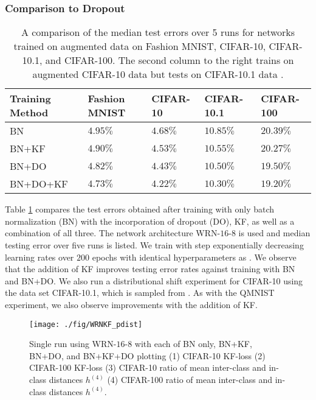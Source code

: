 \documentclass[11pt]{article}
\begin{document}
\subsubsection{Comparison to Dropout}

\begin{table}[h]
\begin{center}
\begin{tabular}{ | p{3.4cm} || p{2.0cm} | p{2.0cm} | p{2.0cm}| p{2.0cm}|}
\hline
\textbf{Training Method} & \textbf{Fashion MNIST} & \textbf{CIFAR-10} & \textbf{CIFAR-10.1} & \textbf{CIFAR-100}\\
\hline
BN & $4.95 \%$ & $4.68 \%$ & $10.85 \%$ & $20.39\%$\\

BN+KF & $4.90 \%$ & $4.53\%$ & $10.55 \%$ & $20.27\%$\\

BN+DO & $4.82 \%$ & $4.43\%$ & $10.50 \%$ & $19.50\%$\\

BN+DO+KF & $4.73\%$ & $4.22\%$ & $10.30\%$ & $19.20\%$\\
\hline


\end{tabular}
\end{center}
\caption{A comparison of the median test errors over 5 runs for networks trained on augmented data on Fashion MNIST, CIFAR-10, CIFAR-10.1, and CIFAR-100.  The second column to the right trains on augmented CIFAR-10 data but tests on CIFAR-10.1 data \cite{cifar101, 80M_tinyimages}.}\label{WRNKFvsDO}
\end{table}

Table \ref{WRNKFvsDO} compares the test errors obtained after training with only batch normalization (BN) with the incorporation of dropout (DO), KF, as well as a combination of all three.  The network architecture WRN-$16$-$8$ is used and median testing error over five runs is listed.  We train with step exponentially decreasing learning rates over $200$ epochs with identical hyperparameters as \cite{WRNZagKom}.  We observe that the addition of KF improves testing error rates against training with BN and BN+DO.  We also run a distributional shift experiment for CIFAR-10 using the data set CIFAR-10.1, \cite{cifar101} which is sampled from \cite{80M_tinyimages}.  As with the QMNIST experiment, we also observe improvements with the addition of KF.  

\begin{figure}[h]
	\begin{center}
			\texttt{[image: ./fig/WRNKF\_pdist]}
		\caption{Single run using WRN-$16$-$8$ with each of BN only, BN+KF, BN+DO, and BN+KF+DO plotting (1) CIFAR-10 KF-loss (2) CIFAR-100 KF-loss (3) CIFAR-10 ratio of mean inter-class and in-class distances $h^{(4)}$ (4) CIFAR-100 ratio of mean inter-class and in-class distances $h^{(4)}$.}\label{WRNKF_lossratio}
	\end{center}
\end{figure}
\end{document}
